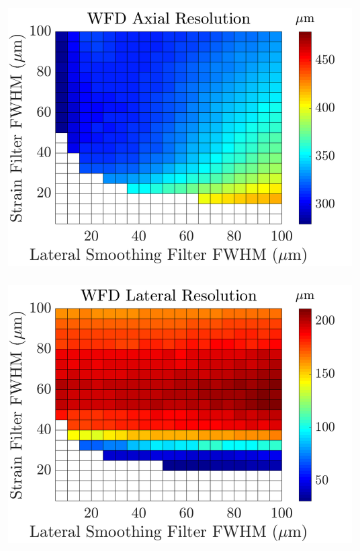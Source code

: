 {\begin{figure}[h!]
\begin{subfigure}{0.49\textwidth}
		\includegraphics[width=\textwidth]{imageres_figs/wfd_axial.png}
	\end{subfigure}
	\begin{subfigure}{0.49\textwidth}
		\centering
		\includegraphics[width=\textwidth]{imageres_figs/wfd_lateral.png}
	\end{subfigure}
	\\
	\begin{subfigure}{0.49\textwidth}
		\centering

\end{subfigure}
\end{figure}}
